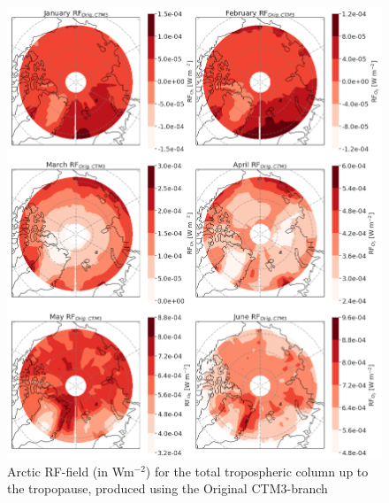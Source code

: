 \begin{figure}[ht]
    \centering
    \includegraphics[width = \linewidth]{Chapter6_Results/images/RF/Orig_RF_arctic.png}
    \caption{Arctic RF-field (in Wm$^{-2}$) for the total tropospheric column up to the tropopause, produced using the Original CTM3-branch}
    \label{fig:origRF_arctic_2001}
\end{figure}